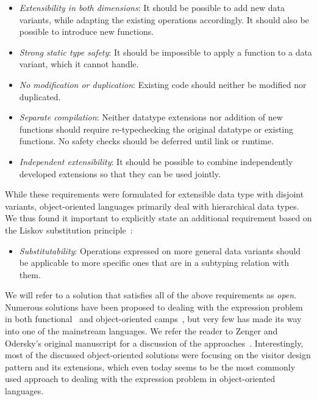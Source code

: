 \begin{itemize}
\setlength{\itemsep}{0pt}
\setlength{\parskip}{0pt}
\item \emph{Extensibility in both dimensions}: It should be possible to add new 
      data variants, while adapting the existing operations accordingly. It 
      should also be possible to introduce new functions. 
\item \emph{Strong static type safety}: It should be impossible to apply a 
      function to a data variant, which it cannot handle. 
\item \emph{No modification or duplication}: Existing code should neither be 
      modified nor duplicated.
\item \emph{Separate compilation}: Neither datatype extensions nor addition of 
      new functions should require re-typechecking the original datatype or 
      existing functions. No safety checks should be deferred until link or 
      runtime.
\item \emph{Independent extensibility}: It should be possible to combine 
      independently developed extensions so that they can be used jointly.
\end{itemize}

\noindent
While these requirements were formulated for extensible data type with 
disjoint variants, object-oriented languages primarily deal with 
hierarchical data types. We thus found it important to explicitly state an 
additional requirement based on the Liskov substitution principle~\cite{Lis87}:

\begin{itemize}
\setlength{\itemsep}{0pt}
\setlength{\parskip}{0pt}
\item \emph{Substitutability}: Operations expressed on more general data variants
      should be applicable to more specific ones that are in a subtyping relation 
      with them.
\end{itemize}


\noindent
We will refer to a solution that satisfies all of the above requirements as \emph{open}. 
Numerous solutions have been proposed to dealing with the expression problem in both 
functional~\cite{garrigue-98,LohHinze2006} and object-oriented 
camps~\cite{Palsberg98,Krishnamurthi98,Zenger:2001,runabout}, but very few has 
made its way into one of the mainstream languages. We refer the reader to Zenger 
and Odersky's original manuscript for a discussion of the approaches~\cite{fool12}.
Interestingly, most of the discussed object-oriented  
solutions were focusing on the visitor design pattern and its extensions, 
which even today seems to be the most commonly used approach to dealing with the 
expression problem in object-oriented languages.

